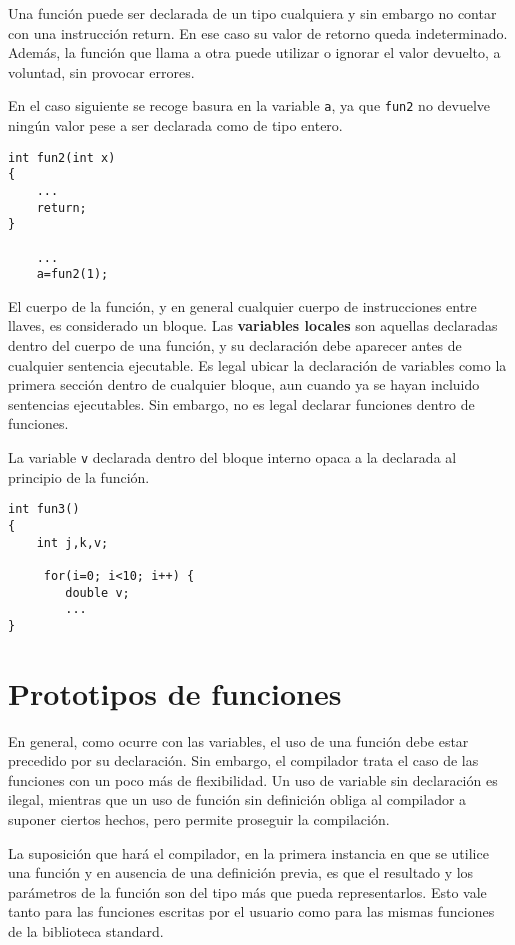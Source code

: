 Una función puede ser declarada de un tipo cualquiera y sin embargo no contar
con una instrucción return. En ese caso su valor de retorno queda
indeterminado. Además, la función que llama a otra puede utilizar o ignorar el
valor devuelto, a voluntad, sin provocar errores.

\begin{ejemplo}
En el caso siguiente se recoge basura en la variable \texttt{a}, ya que \texttt{fun2} no devuelve
ningún valor pese a ser declarada como de tipo entero.
\begin{lstlisting}
int fun2(int x)
{
    ...
    return;
}

    ...
    a=fun2(1);
\end{lstlisting}
\end{ejemplo}


El cuerpo de la función, y en general cualquier cuerpo de instrucciones entre
llaves, es considerado un bloque. Las \textbf{variables locales} son aquellas declaradas
dentro del cuerpo de una función, y su declaración debe aparecer antes de
cualquier sentencia ejecutable. Es legal ubicar la declaración de variables
como la primera sección dentro de cualquier bloque, aun cuando ya se hayan
incluido sentencias ejecutables. Sin embargo, no es legal declarar funciones
dentro de funciones. 

\begin{ejemplo}
La variable \texttt{v} declarada dentro del bloque
interno opaca a la declarada al principio de la función.
\begin{lstlisting}
int fun3()
{
    int j,k,v;

     for(i=0; i<10; i++) {
        double v;
        ...
}
\end{lstlisting}
\end{ejemplo}

	

\section{Prototipos de funciones}
En general, como ocurre con las variables, el uso de una función debe estar
precedido por su declaración. Sin embargo, el compilador trata el caso de las
funciones con un poco más de flexibilidad. Un uso de variable sin declaración
es ilegal, mientras que un uso de función sin definición obliga al compilador a
suponer ciertos hechos, pero permite proseguir la compilación.

La suposición que hará el compilador, en la primera instancia en que se utilice
una función y en ausencia de una definición previa, es que el resultado y los
parámetros de la función son del tipo más  que pueda representarlos.
Esto vale tanto para las funciones escritas por el usuario como para las mismas
funciones de la biblioteca standard. 

